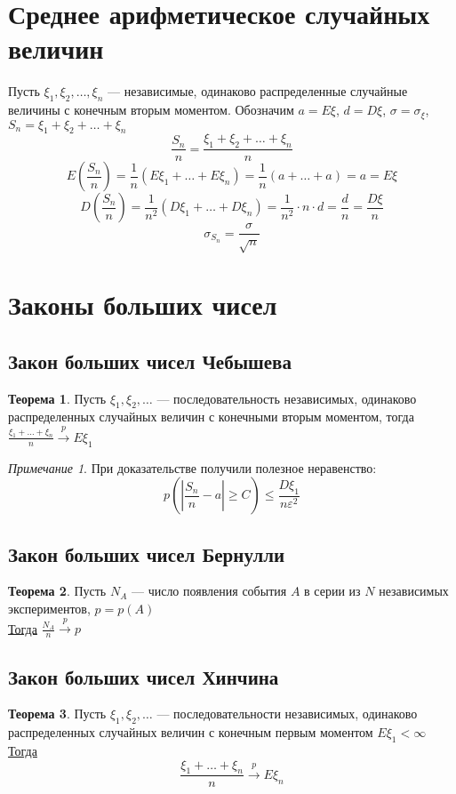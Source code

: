 \documentclass[english]{article}
\theoremstyle{plain}
\theoremstyle{remark}
\newtheorem*{remark}{Примечание}
\theoremstyle{definition}
\newtheorem{theorem}{Теорема}[section]
\begin{document}
\section{Среднее арифметическое случайных величин}
\label{sec:orgefbc95b}
Пусть \(\xi_1, \xi_2, \dots, \xi_n\) --- независимые, одинаково распределенные случайные величины с конечным вторым моментом. Обозначим \(a = E\xi\), \(d = D\xi\), \(\sigma = \sigma_{\xi}\), \(S_n = \xi_1 + \xi_2 + \dots + \xi_n\)
\[ \frac{S_n}{n} = \frac{\xi_1 + \xi_2 + \dots + \xi_n}{n} \]
\[ E \left(\frac{S_n}{n}\right) = \frac{1}{n}(E\xi_1 + \dots + E\xi_n) = \frac{1}{n}(a + \dots + a) = a = E\xi \]
\[ D \left(\frac{S_n}{n}\right) = \frac{1}{n^2}(D\xi_1 + \dots + D\xi_n) = \frac{1}{n^2} \cdot n \cdot d = \frac{d}{n} = \frac{D\xi}{n} \]
\[ \sigma_{S_n} = \frac{\sigma}{\sqrt{n}} \]
\section{Законы больших чисел}
\label{sec:org21fd4bd}
\subsection{Закон больших чисел Чебышева}
\label{sec:org27481bf}
\begin{theorem}
Пусть \(\xi_1, \xi_2, \dots\) --- последовательность независимых, одинаково распределенных случайных величин с конечными вторым моментом, тогда \(\frac{\xi_1 + \dots + \xi_n}{n} \xrightarrow{p} E\xi_1\)
\end{theorem}
\begin{remark}
При доказательстве получили полезное неравенство:
\[ p \left(\left|\frac{S_n}{n} - a \right| \ge C\right) \le \frac{D\xi_1}{n \varepsilon^2} \]
\end{remark}
\subsection{Закон больших чисел Бернулли}
\label{sec:orgad46fad}
\begin{theorem}
Пусть \(N_A\) --- число появления события \(A\) в серии из \(N\) независимых экспериментов, \(p = p(A)\) \\
\uline{Тогда} \(\frac{N_A}{n} \xrightarrow{p} p\) 
\end{theorem}
\subsection{Закон больших чисел Хинчина}
\label{sec:org6142326}
\begin{theorem}
Пусть \(\xi_1, \xi_2, \dots\) --- последовательности независимых, одинаково распределенных случайных величин с конечным первым моментом \(E\xi_1 < \infty\) \\
\uline{Тогда} \[ \frac{\xi_1 + \dots + \xi_n}{n} \xrightarrow{p} E\xi_n \]
\label{orgac8e644}
\end{theorem}
\end{document}
